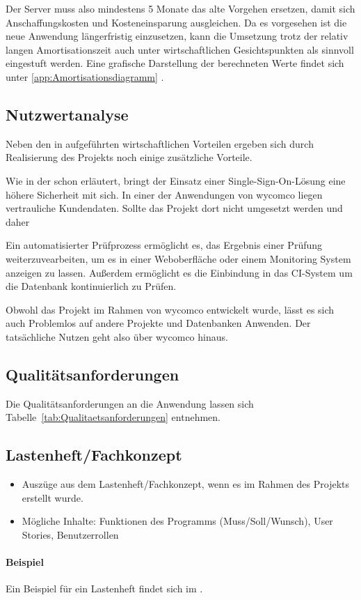 Der Server muss also mindestens 5 Monate das alte Vorgehen ersetzen,
damit sich Anschaffungskosten und Kosteneinsparung ausgleichen. Da es vorgesehen ist die
neue Anwendung längerfristig einzusetzen, kann die Umsetzung trotz der relativ langen
Amortisationszeit auch unter wirtschaftlichen Gesichtspunkten als sinnvoll eingestuft werden.
Eine grafische Darstellung der berechneten Werte findet sich unter \ref{app:Amortisationsdiagramm} .


\subsection{Nutzwertanalyse}
\label{sec:Nutzwertanalyse}

Neben den in  aufgeführten wirtschaftlichen Vorteilen ergeben sich durch Realisierung des Projekts noch einige zusätzliche Vorteile.

Wie in der  schon erläutert, bringt der Einsatz einer Single-Sign-On-Lösung eine höhere Sicherheit mit sich.
In einer der Anwendungen von wycomco liegen vertrauliche Kundendaten. Sollte das Projekt dort nicht umgesetzt werden und daher 



Ein automatisierter Prüfprozess ermöglicht es, das Ergebnis einer Prüfung weiterzuvearbeiten, um es \zB in einer Weboberfläche oder einem Monitoring System anzeigen zu lassen. Außerdem ermöglicht es die Einbindung in das \acs{CI}-System um die Datenbank kontinuierlich zu Prüfen. 

Obwohl das Projekt im Rahmen von wycomco entwickelt wurde, lässt es sich auch Problemlos auf andere Projekte und Datenbanken Anwenden. Der tatsächliche Nutzen geht also über wycomco hinaus.


\subsection{Qualitätsanforderungen}
\label{sec:Qualitaetsanforderungen}

Die Qualitätsanforderungen an die Anwendung lassen sich Tabelle~\ref{tab:Qualitaetsanforderungen} entnehmen.



\subsection{Lastenheft/Fachkonzept}
\label{sec:Lastenheft}
\begin{itemize}
	\item Auszüge aus dem Lastenheft/Fachkonzept, wenn es im Rahmen des Projekts erstellt wurde.
	\item Mögliche Inhalte: Funktionen des Programms (Muss/Soll/Wunsch), User Stories, Benutzerrollen
\end{itemize}

\paragraph{Beispiel}
Ein Beispiel für ein Lastenheft findet sich im . 

